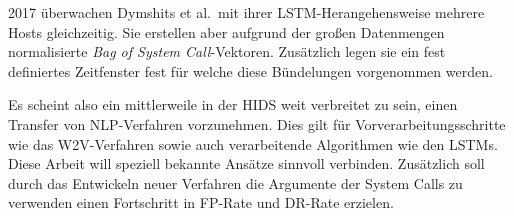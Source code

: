         2017 überwachen Dymshits et al.\ mit ihrer LSTM-Herangehensweise mehrere Hosts gleichzeitig.
        Sie erstellen aber aufgrund der großen Datenmengen normalisierte \textit{Bag of System Call}-Vektoren.
        Zusätzlich legen sie ein fest definiertes Zeitfenster fest für welche diese Bündelungen vorgenommen werden.~\cite{LSTMDYMSHITS2017}

        Es scheint also ein mittlerweile in der \ac{HIDS} weit verbreitet zu sein, einen Transfer von \ac{NLP}-Verfahren vorzunehmen.
        Dies gilt für Vorverarbeitungsschritte wie das \ac{W2V}-Verfahren sowie auch verarbeitende Algorithmen wie den \acp{LSTM}.
        Diese Arbeit will speziell bekannte Ansätze sinnvoll verbinden.
        Zusätzlich soll durch das Entwickeln neuer Verfahren die Argumente der System Calls zu verwenden einen Fortschritt in \ac{FP}-Rate und \ac{DR}-Rate erzielen.





